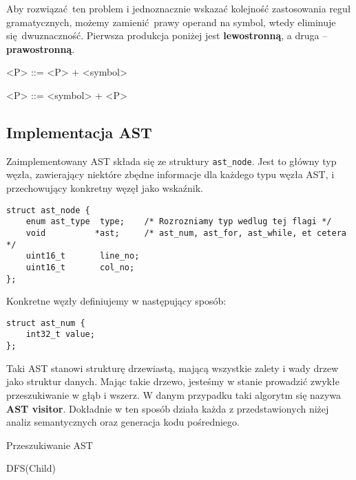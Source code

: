 \documentclass[leqno, 12pt]{article}
\newcommand{\spacing}{\vskip 0.5cm}
\begin{document}
			Aby rozwiązać ten problem i jednoznacznie wskazać kolejność zastosowania reguł gramatycznych,
			możemy zamienić prawy operand na symbol, wtedy eliminuje się dwuznaczność. Pierwsza produkcja
			poniżej jest \textbf{lewostronną}, a druga -- \textbf{prawostronną}.

			\begin{grammar}
		        <P> ::= <P> + <symbol>
	
		        <P> ::= <symbol> + <P>
			\end{grammar}

		\subsection{Implementacja AST}

			Zaimplementowany AST składa się ze struktury \texttt{ast_node}. Jest to główny typ
			węzła, zawierający niektóre zbędne informacje dla każdego typu węzła AST, i przechowujący
			konkretny węzęł jako wskaźnik.

			\spacing

\begin{lstlisting}[label={lst:ast-node}]
struct ast_node {
    enum ast_type  type;    /* Rozrozniamy typ wedlug tej flagi */
    void          *ast;     /* ast_num, ast_for, ast_while, et cetera */
    uint16_t       line_no;
    uint16_t       col_no;
};
\end{lstlisting}
			
			\spacing
			
			Konkretne węzły definiujemy w następujący sposób:

			\spacing

\begin{lstlisting}[label={lst:ast-concrete-node}]
struct ast_num {
    int32_t value;
};
\end{lstlisting}
			
			\spacing
			
			Taki AST stanowi strukturę drzewiastą, mającą wszystkie zalety i wady drzew jako struktur
			danych. Mając takie drzewo, jesteśmy w stanie prowadzić zwykłe przeszukiwanie w głąb
			i wszerz. W danym przypadku taki algorytm się nazywa \textbf{AST visitor}. Dokładnie w ten
			sposób działa każda z przedstawionych niżej analiz semantycznych
			oraz generacja kodu pośredniego.

			\spacing

			\begin{algorithm}
				\caption{Przeszukiwanie AST}
				\begin{algorithmic}[1]

						\State DFS(Child)
					\EndFor
				\EndProcedure

				\end{algorithmic}
			\end{algorithm}
\end{document}
